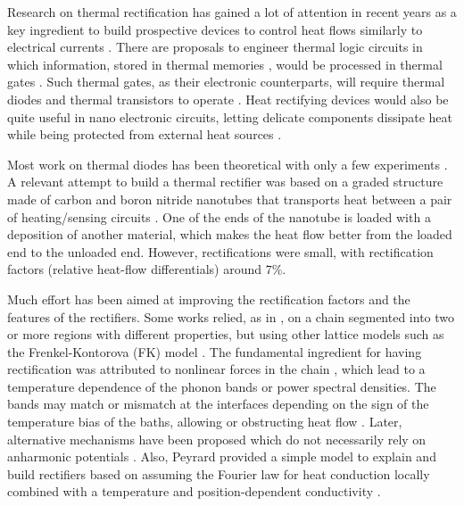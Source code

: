 Research on thermal rectification has gained a lot of attention in recent years as a key ingredient to build
prospective devices to control heat flows similarly to electrical currents \cite{Roberts2011,Li2012}. There are  proposals
to engineer thermal logic circuits \cite{Ye2017} in which information, stored in thermal memories \cite{Wang2008}, would be processed in thermal gates \cite{Wang2007}. Such thermal gates, as their electronic counterparts,  will require thermal diodes and thermal transistors  to operate \cite{Casati2006,Joulain2016}.
Heat rectifying devices would also be quite useful  in nano electronic circuits, letting delicate components dissipate heat while being protected from external heat sources \cite{Roberts2011}.

Most work on thermal diodes has been theoretical with only a few experiments \cite{Chang2006,Kobayashi2009,Leitner2013,Elzouka2017}.
A relevant attempt to build a thermal rectifier was based on a graded structure made of carbon and boron nitride nanotubes that transports heat between a pair of heating/sensing circuits \cite{Chang2006}. One of the ends of the nanotube is loaded with a deposition of another material, which makes the heat flow better from the loaded end to the unloaded end. However, rectifications were small, with rectification factors (relative
heat-flow differentials) around $7\%$.

Much effort has been aimed at improving the rectification factors and the features of the rectifiers. Some works
relied, as in \cite{Terraneo2002}, on a chain segmented into two or more regions  with different properties,  but using other lattice models such as the Frenkel-Kontorova (FK) model \cite{Li2008,Hu2006}.
The fundamental ingredient for having rectification  was attributed to nonlinear forces in the chain \cite{Zeng2008,Katz2016,Li2008,Hu2006,Benenti2016,Li2012}, which lead to a temperature dependence of the phonon bands or power spectral densities. The bands may match or mismatch at the
interfaces depending on the sign of the temperature bias of the baths, allowing or obstructing heat flow \cite{Terraneo2002,Li2004}.  Later, alternative mechanisms have been
proposed which do not necessarily rely on anharmonic potentials \cite{Pereira2017,Pons2017}.
Also, Peyrard provided a simple model to explain and build rectifiers based on assuming the Fourier law for heat conduction locally
combined with a temperature and position-dependent conductivity \cite{Peyrard2006}.


